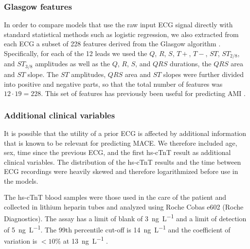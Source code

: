 \documentclass[preprint]{elsarticle}
\begin{document}
\subsubsection{Glasgow features}
\label{sec:glasgow}
In order to compare models that use the raw input ECG signal directly with standard statistical methods such as logistic regression, we also extracted from each ECG a subset of 228 features derived from the Glasgow algorithm \citep{macfarlane2005}. Specifically, for each of the 12 leads we used the $Q$, $R$, $S$, $T+$, $T-$, $ST$, $ST_{2/8}$, and $ST_{3/8}$ amplitudes as well as the $Q$, $R$, $S$, and $QRS$ durations, the $QRS$ area and $ST$ slope. The $ST$ amplitudes, $QRS$ area and $ST$ slopes were further divided into positive and negative parts, so that the total number of features was $12 \cdot 19=228$. This set of features has previously been useful for predicting AMI \citep{forberg2009}.

\subsubsection{Additional clinical variables}
It is possible that the utility of a prior ECG is affected by additional information that is known to be relevant for predicting MACE. We therefore included age, sex, time since the previous ECG, and the first hs-cTnT result as additional clinical variables. The distribution of the hs-cTnT results and the time between ECG recordings were heavily skewed and therefore logarithmized before use in the models. 

The hs-cTnT blood samples were those used in the care of the patient and collected in lithium heparin tubes and analyzed using Roche Cobas e602 (Roche Diagnostics). The assay has a limit of blank of \SI{3}{\nano\gram\per\liter} and a limit of detection of \SI{5}{\nano\gram\per\liter}. The 99th percentile cut-off is \SI{14}{\nano\gram\per\liter} and the coefficient of variation is $<10\%$ at \SI{13}{\nano\gram\per\liter} \citep{giannitsis2010}.
\end{document}
